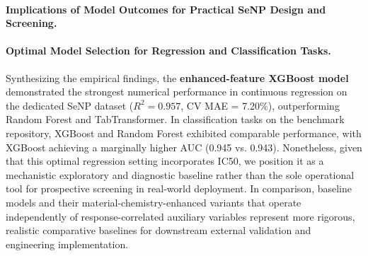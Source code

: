 \paragraph{Implications of Model Outcomes for Practical SeNP Design and Screening.}

\paragraph{Optimal Model Selection for Regression and Classification Tasks.}
Synthesizing the empirical findings, the \textbf{enhanced-feature XGBoost model} demonstrated the strongest numerical performance in continuous regression on the dedicated SeNP dataset ($R^2 = 0.957$, CV MAE = 7.20\%), outperforming Random Forest and TabTransformer. In classification tasks on the benchmark repository, XGBoost and Random Forest exhibited comparable performance, with XGBoost achieving a marginally higher AUC (0.945 vs. 0.943). Nonetheless, given that this optimal regression setting incorporates IC50, we position it as a mechanistic exploratory and diagnostic baseline rather than the sole operational tool for prospective screening in real-world deployment. In comparison, baseline models and their material-chemistry-enhanced variants that operate independently of response-correlated auxiliary variables represent more rigorous, realistic comparative baselines for downstream external validation and engineering implementation.


